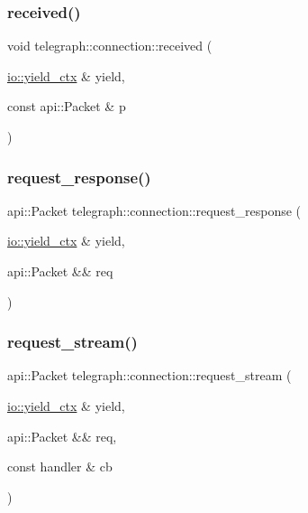 \subsubsection{\texorpdfstring{received()}{received()}}
{\footnotesize\ttfamily void telegraph\+::connection\+::received (\begin{DoxyParamCaption}\item[{\hyperlink{structboost_1_1asio_1_1yield__ctx}{io\+::yield\+\_\+ctx} \&}]{yield,  }\item[{const api\+::\+Packet \&}]{p }\end{DoxyParamCaption})}

\mbox{\label{classtelegraph_1_1connection_a5edeb1d722fad636d63f125d896e41c4}} 
\subsubsection{\texorpdfstring{request\+\_\+response()}{request\_response()}}
{\footnotesize\ttfamily api\+::\+Packet telegraph\+::connection\+::request\+\_\+response (\begin{DoxyParamCaption}\item[{\hyperlink{structboost_1_1asio_1_1yield__ctx}{io\+::yield\+\_\+ctx} \&}]{yield,  }\item[{api\+::\+Packet \&\&}]{req }\end{DoxyParamCaption})}

\mbox{\label{classtelegraph_1_1connection_a769414199f9cf151ff115f223f07fb5c}} 
\subsubsection{\texorpdfstring{request\+\_\+stream()}{request\_stream()}}
{\footnotesize\ttfamily api\+::\+Packet telegraph\+::connection\+::request\+\_\+stream (\begin{DoxyParamCaption}\item[{\hyperlink{structboost_1_1asio_1_1yield__ctx}{io\+::yield\+\_\+ctx} \&}]{yield,  }\item[{api\+::\+Packet \&\&}]{req,  }\item[{const handler \&}]{cb }\end{DoxyParamCaption})}

